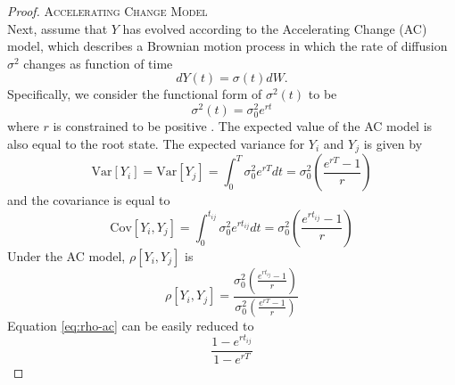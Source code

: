 \documentclass[12pt,twoside]{article}
\newcommand{\Var}{\mathrm{Var}}
\newcommand{\Cov}{\mathrm{Cov}}
\begin{document}
\begin{proof}
\par{\textsc{Accelerating Change Model}}\\
Next, assume that $Y$ has evolved according to the Accelerating Change (AC) model, which describes a Brownian motion process in which the rate of diffusion $\sigma^2$ changes as function of time
\begin{equation}
dY(t)=\sigma(t)dW. 
\end{equation}
Specifically, we consider the functional form of $\sigma^2(t)$ to be
\[\sigma^2 (t) = \sigma^2_0 e^{rt}\]
where $r$ is constrained to be positive \citep{Blomberg2003, SlaterFossil}. The expected value of the AC model is also equal to the root state. The expected variance for $Y_i$ and $Y_j$ is given by
\begin{equation}\label{eq:var-ac}
\Var[Y_i] = \Var[Y_j] = \int^T_0 \sigma^2_0 e^{rT} dt = \sigma^2_0 \left( \frac{e^{rT} - 1}{r} \right)
\end{equation}
and the covariance is equal to
\begin{equation}
\Cov[Y_i,Y_j] = \int^{t_{ij}}_0 \sigma^2_0 e^{rt_{ij}} dt = \sigma^2_0 \left( \frac{e^{rt_{ij}} - 1}{r} \right)
\end{equation}
Under the AC model, $\rho[Y_i, Y_j]$ is
\begin{equation}\label{eq:rho-ac}
\rho[Y_i, Y_j] = \frac{\sigma^2_0 \left( \frac{e^{rt_{ij}} - 1}{r} \right)}{\sigma^2_0 \left( \frac{e^{rT} - 1}{r} \right)}
\end{equation}
Equation \ref{eq:rho-ac} can be easily reduced to
\begin{equation}
\frac{1-e^{rt_{ij}}}{1-e^{r T}}
\end{equation}\bigskip


\end{proof}
\end{document}
